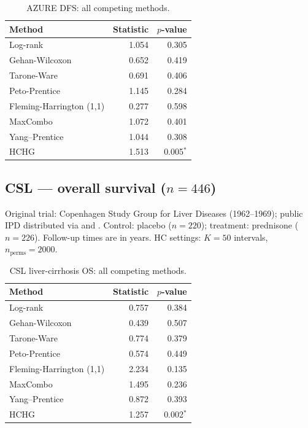 \documentclass[11pt]{article}
\newcommand{\sig}{$^{\ast}$}
\begin{document}
\begin{table}[h]
  \centering
  \caption{AZURE DFS: all competing methods.}
  \label{tab:azure}
  \begin{tabular}{@{}lrr@{}}
    \toprule
    Method & Statistic & $p$-value \\
    \midrule
    Log-rank                         &  1.054 & 0.305 \\
    Gehan-Wilcoxon                   &  0.652 & 0.419 \\
    Tarone-Ware                      &  0.691 & 0.406 \\
    Peto-Prentice                    &  1.145 & 0.284 \\
    Fleming-Harrington (1,1)         &  0.277 & 0.598 \\
    MaxCombo                         &  1.072 & 0.401 \\
    Yang--Prentice                   &  1.044 & 0.308 \\
    HCHG                             &  1.513 & 0.005\sig \\
    \bottomrule
  \end{tabular}
\end{table}

\subsection*{CSL --- overall survival ($n=446$)}

Original trial: Copenhagen Study Group for Liver Diseases (1962--1969);
public IPD distributed via \citet{csl_data} and \citet{survset2022}.
Control: placebo ($n=220$); treatment: prednisone ($n=226$).
Follow-up times are in years.  HC settings: $K=50$ intervals,
$n_\mathrm{perms}=2000$.

\begin{table}[h]
  \centering
  \caption{CSL liver-cirrhosis OS: all competing methods.}
  \label{tab:csl}
  \begin{tabular}{@{}lrr@{}}
    \toprule
    Method & Statistic & $p$-value \\
    \midrule
    Log-rank                         &  0.757 & 0.384 \\
    Gehan-Wilcoxon                   &  0.439 & 0.507 \\
    Tarone-Ware                      &  0.774 & 0.379 \\
    Peto-Prentice                    &  0.574 & 0.449 \\
    Fleming-Harrington (1,1)         &  2.234 & 0.135 \\
    MaxCombo                         &  1.495 & 0.236 \\
    Yang--Prentice                   &  0.872 & 0.393 \\
    HCHG                             &  1.257 & 0.002\sig \\
    \bottomrule
  \end{tabular}
\end{table}
\end{document}
